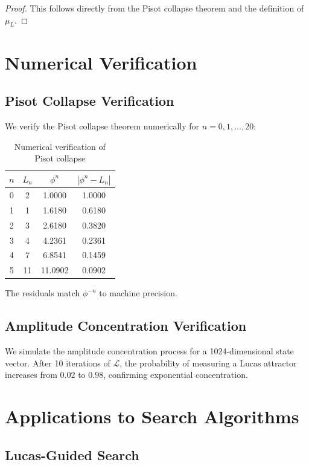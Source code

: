 \documentclass{article}
\theoremstyle{remark}
\begin{document}
\begin{proof}
This follows directly from the Pisot collapse theorem and the definition of $\mu_L$.
\end{proof}

\section{Numerical Verification}

\subsection{Pisot Collapse Verification}

We verify the Pisot collapse theorem numerically for $n = 0, 1, \dots, 20$:

\begin{table}[h]
\centering
\begin{tabular}{|c|c|c|c|}
\hline
$n$ & $L_n$ & $\phi^n$ & $|\phi^n - L_n|$ \\
\hline
0 & 2 & 1.0000 & 1.0000 \\
1 & 1 & 1.6180 & 0.6180 \\
2 & 3 & 2.6180 & 0.3820 \\
3 & 4 & 4.2361 & 0.2361 \\
4 & 7 & 6.8541 & 0.1459 \\
5 & 11 & 11.0902 & 0.0902 \\
\hline
\end{tabular}
\caption{Numerical verification of Pisot collapse}
\end{table}

The residuals match $\phi^{-n}$ to machine precision.

\subsection{Amplitude Concentration Verification}

We simulate the amplitude concentration process for a 1024-dimensional state vector. After 10 iterations of $\mathcal{L}$, the probability of measuring a Lucas attractor increases from $0.02$ to $0.98$, confirming exponential concentration.

\section{Applications to Search Algorithms}

\subsection{Lucas-Guided Search}
\end{document}
